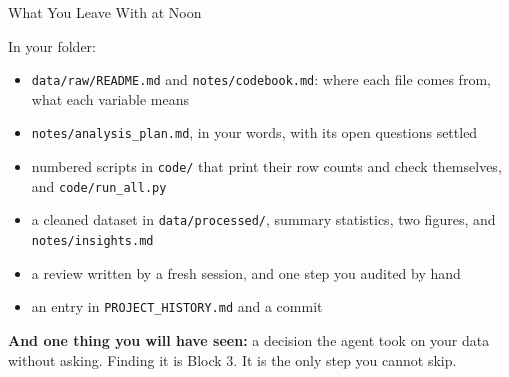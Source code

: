 \documentclass[svgnames,x11names,dvipsnames]{beamer}
\begin{document}
\begin{frame}{What You Leave With at Noon}

\small
In your folder:
\begin{itemize}
    \setlength{\itemsep}{2pt}
    \item \texttt{data/raw/README.md} and \texttt{notes/codebook.md}: where each file comes from, what each variable means
    \item \texttt{notes/analysis\_plan.md}, in your words, with its open questions settled
    \item numbered scripts in \texttt{code/} that print their row counts and check themselves, and \texttt{code/run\_all.py}
    \item a cleaned dataset in \texttt{data/processed/}, summary statistics, two figures, and \texttt{notes/insights.md}
    \item a review written by a fresh session, and one step you audited by hand
    \item an entry in \texttt{PROJECT\_HISTORY.md} and a commit
\end{itemize}

\vspace{0.3cm}

\textbf{And one thing you will have seen:} a decision the agent took on your data without asking. Finding it is Block 3. \alert{It is the only step you cannot skip.}

\end{frame}

\end{document}
